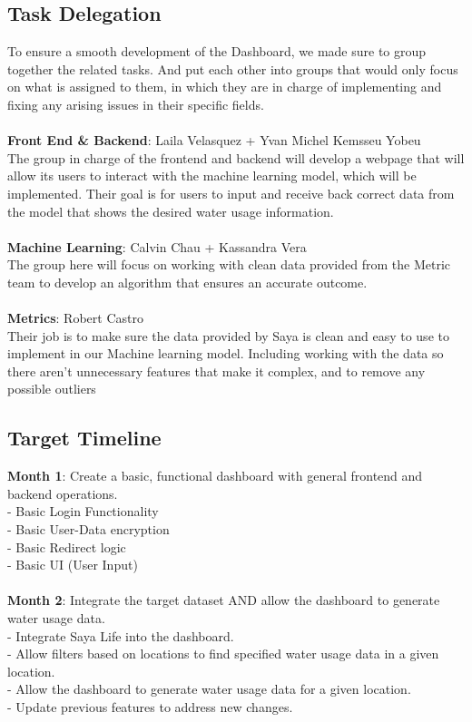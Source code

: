 \documentclass[10pt]{article}
\begin{document}
\newpage

\subsection*{Task Delegation}
To ensure a smooth development of the Dashboard, we made sure to group together the related tasks. And put each other into groups that would only focus on what is assigned to them, in which they are in charge of implementing and fixing any arising issues in their specific fields.\\
\\\textbf{Front End \& Backend}: Laila Velasquez + Yvan Michel Kemsseu Yobeu\\
The group in charge of the frontend and backend will develop a webpage that will allow its users to interact with the machine learning model, which will be implemented. Their goal is for users to input and receive back correct data from the model that shows the desired water usage information.\\
\\\textbf{Machine Learning}: Calvin Chau + Kassandra Vera\\
The group here will focus on working with clean data provided from the Metric team to develop an algorithm that ensures an accurate outcome.\\
\\\textbf{Metrics}: Robert Castro\\
Their job is to make sure the data provided by Saya is clean and easy to use to implement in our Machine learning model. Including working with the data so there aren't unnecessary features that make it complex, and to remove any possible outliers

\subsection*{Target Timeline}
\textbf{Month 1}: Create a basic, functional dashboard with general frontend and backend operations.\\
- Basic Login Functionality\\
- Basic User-Data encryption\\
- Basic Redirect logic\\
- Basic UI (User Input)\\
\\\textbf{Month 2}: Integrate the target dataset AND allow the dashboard to generate water usage data.\\
- Integrate Saya Life into the dashboard.\\
- Allow filters based on locations to find specified water usage data in a given location.\\
- Allow the dashboard to generate water usage data for a given location.\\
- Update previous features to address new changes.\\
\end{document}
